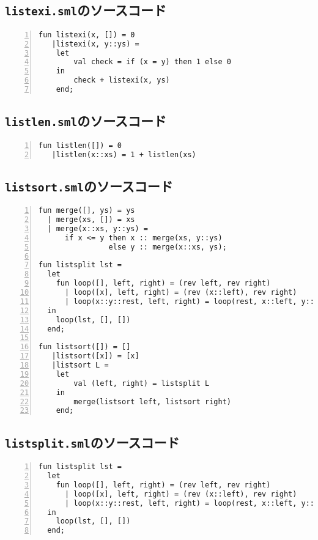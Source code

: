 \documentclass[autodetect-engine,dvi=dvipdfmx,ja=standard,
               a4j,11pt]{bxjsarticle}
\begin{document}
\subsection{\texttt{listexi.sml}のソースコード} \label{listexi_code}
\begin{Verbatim}[numbers=left, xleftmargin=8mm, numbersep=6pt,
    fontsize=\small, baselinestretch=0.8]
fun listexi(x, []) = 0
   |listexi(x, y::ys) = 
    let
        val check = if (x = y) then 1 else 0
    in
        check + listexi(x, ys)
    end;
\end{Verbatim}
\subsection{\texttt{listlen.sml}のソースコード} \label{listlen_code}
\begin{Verbatim}[numbers=left, xleftmargin=8mm, numbersep=6pt,
    fontsize=\small, baselinestretch=0.8]
fun listlen([]) = 0
   |listlen(x::xs) = 1 + listlen(xs)
\end{Verbatim}
\subsection{\texttt{listsort.sml}のソースコード} \label{listsort_code}
\begin{Verbatim}[numbers=left, xleftmargin=8mm, numbersep=6pt,
    fontsize=\small, baselinestretch=0.8]
fun merge([], ys) = ys
  | merge(xs, []) = xs
  | merge(x::xs, y::ys) =
      if x <= y then x :: merge(xs, y::ys)
                else y :: merge(x::xs, ys);

fun listsplit lst =
  let
    fun loop([], left, right) = (rev left, rev right)
      | loop([x], left, right) = (rev (x::left), rev right)
      | loop(x::y::rest, left, right) = loop(rest, x::left, y::right)
  in
    loop(lst, [], [])
  end;

fun listsort([]) = []
   |listsort([x]) = [x] 
   |listsort L = 
    let 
        val (left, right) = listsplit L
    in
        merge(listsort left, listsort right)
    end;
\end{Verbatim}
\subsection{\texttt{listsplit.sml}のソースコード} \label{listsplit_code}
\begin{Verbatim}[numbers=left, xleftmargin=8mm, numbersep=6pt,
    fontsize=\small, baselinestretch=0.8]
fun listsplit lst =
  let
    fun loop([], left, right) = (rev left, rev right)
      | loop([x], left, right) = (rev (x::left), rev right)
      | loop(x::y::rest, left, right) = loop(rest, x::left, y::right)
  in
    loop(lst, [], [])
  end;
\end{Verbatim}
\end{document}
